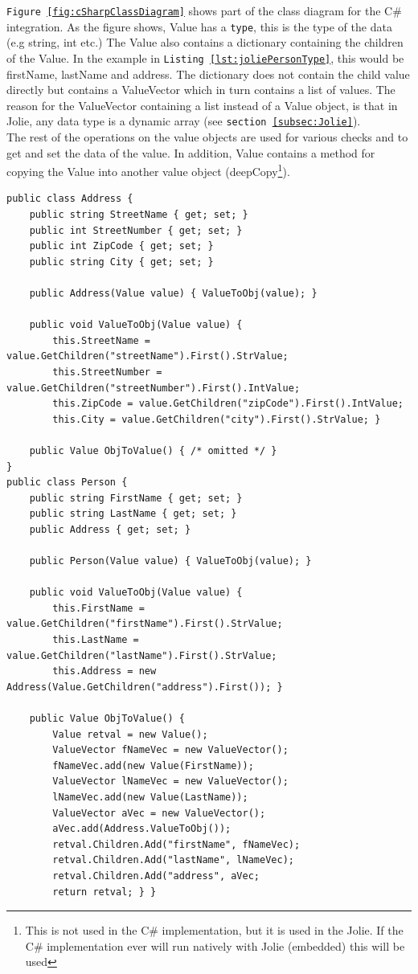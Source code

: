 \documentclass[12pt,a4paper]{article}
\begin{document}
\texttt{Figure \ref{fig:cSharpClassDiagram}} shows part of the class diagram for the C\# integration. As the figure shows, Value has a \texttt{type}, this is the type of the data (e.g string, int etc.) The Value also contains a dictionary containing the children of the Value. In the example in \texttt{Listing \ref{lst:joliePersonType}}, this would be firstName, lastName and address. The dictionary does not contain the child value directly but contains a ValueVector which in turn contains a list of values. The reason for the ValueVector containing a list instead of a Value object, is that in Jolie, any data type is a dynamic array (see \texttt{section \ref{subsec:Jolie}}). \\
The rest of the operations on the value objects are used for various checks and to get and set the data of the value. In addition, Value contains a method for copying the Value into another value object (deepCopy\footnote{This is not used in the C\# implementation, but it is used in the Jolie. If the C\# implementation ever will run natively with Jolie (embedded) this will be used}). \\

\begin{lstlisting}[caption={Person type in C\#},label={lst:personTypeInCSharp}]
public class Address {
	public string StreetName { get; set; }
	public int StreetNumber { get; set; }
	public int ZipCode { get; set; }
	public string City { get; set; }
	
	public Address(Value value) { ValueToObj(value); }

	public void ValueToObj(Value value) {
		this.StreetName = value.GetChildren("streetName").First().StrValue;
		this.StreetNumber = value.GetChildren("streetNumber").First().IntValue;
		this.ZipCode = value.GetChildren("zipCode").First().IntValue;
		this.City = value.GetChildren("city").First().StrValue; }
	
	public Value ObjToValue() { /* omitted */ }
}
public class Person {
	public string FirstName { get; set; }
	public string LastName { get; set; }
	public Address { get; set; }
	
	public Person(Value value) { ValueToObj(value); }
	
	public void ValueToObj(Value value) {
		this.FirstName = value.GetChildren("firstName").First().StrValue;
		this.LastName = value.GetChildren("lastName").First().StrValue;
		this.Address = new Address(Value.GetChildren("address").First()); }
	
	public Value ObjToValue() {
		Value retval = new Value();		
		ValueVector fNameVec = new ValueVector();
		fNameVec.add(new Value(FirstName));
		ValueVector lNameVec = new ValueVector();
		lNameVec.add(new Value(LastName));
		ValueVector aVec = new ValueVector();
		aVec.add(Address.ValueToObj());		
		retval.Children.Add("firstName", fNameVec);
		retval.Children.Add("lastName", lNameVec);
		retval.Children.Add("address", aVec;		
		return retval; } }
\end{lstlisting}
\end{document}
